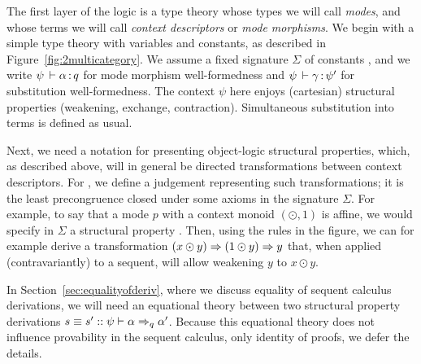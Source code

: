 The first layer of the logic is a type theory whose types we will call
\emph{modes}, and whose terms we will call \emph{context descriptors} or
\emph{mode morphisms}.  We begin with a simple type theory with
variables and constants, as described in
Figure~\ref{fig:2multicategory}.  We assume a fixed signature $\Sigma$
of constants , and we write $\oftp{\psi}{\alpha}{q}$ for mode
morphism well-formedness and $\oftp{\psi}{\gamma}{\psi'}$ for
substitution well-formedness.  The context $\psi$ here enjoys
(cartesian) structural properties (weakening, exchange, contraction).
Simultaneous substitution into terms is defined as usual.

Next, we need a notation for presenting object-logic structural
properties, which, as described above, will in general be directed
transformations between context descriptors.  For
, we define a judgement
     {} representing such
     transformations; it is the least precongruence closed under some
     axioms in the signature $\Sigma$.  For example, to say that a mode
     $p$ with a context monoid $(\odot,1)$ is affine, we would specify
     in $\Sigma$ a structural property .  Then, using
     the rules in the figure, we can for example derive a transformation
     $(x \odot y) \spr (1 \odot y) \spr y$ that, when applied
     (contravariantly) to a sequent, will allow weakening $y$ to $x
     \odot y$.

In Section~\ref{sec:equalityofderiv}, where we discuss equality of
sequent calculus derivations, we will need an equational theory between
two structural property derivations $s \deq s' ::
\wfsp{\psi}{\alpha}{\alpha'}{q}$.  Because this equational theory does
not influence provability in the sequent calculus, only identity of
proofs, we defer the details.

